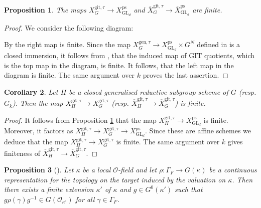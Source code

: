 \documentclass{amsart}
\newtheorem{prop}{Proposition}[section]
\newtheorem{cor}[prop]{Corollary}
\theoremstyle{definition}
\theoremstyle{remark}
\DeclareMathOperator{\GL}{GL}
\newcommand{\OO}{\mathcal O}
\newcommand{\ps}{\mathrm{ps}}
\newcommand{\gen}{\mathrm{gen}}
\newcommand{\gps}{\mathrm{git}}
\newcommand{\XpsGLd}{X^{\ps}_{\GL_d}}
\newcommand{\XbarpsGLd}{\overline{X}^{\ps}_{\GL_d}}
\newcommand{\XgenGtau}{X^{\gen, \tau}_G}
\newcommand{\XbargpsHtau}{\overline{X}^{\gps,\tau}_H}
\newcommand{\XgpsGtau}{X^{\gps, \tau}_{G}}
\newcommand{\XgpsHtau}{X^{\gps, \tau}_{H}}
\newcommand{\XbargpsGtau}{\overline{X}^{\gps,\tau}_G}
\begin{document}
\begin{prop}\label{GGLd_finite} The maps $\XgpsGtau \to \XpsGLd$ and $\XbargpsGtau\rightarrow \XbarpsGLd$ are finite.
\end{prop}

\begin{proof}
    We consider the following diagram:
    \begin{center}
    \end{center}
    By  the right map is finite.
    Since the map $\XgenGtau \to \XpsGLd \times G^N$ defined in  is a closed immersion, it follows from \cite[Theorem 2 (ii)]{seshadri}, that the induced map of GIT quotients, which is the top map in the diagram, is finite. It follows, that the left map in the diagram is finite. The same argument over $k$ proves the last assertion. 
\end{proof}



 \begin{cor}\label{finite_HG} Let $H$ be a closed generalised reductive subgroup scheme of $G$ (resp. $G_k$). Then the 
 map $\XgpsHtau \rightarrow \XgpsGtau$ (resp. $\XbargpsHtau \rightarrow \XbargpsGtau$) is finite. 
\end{cor}
\begin{proof} It follows from Proposition \ref{GGLd_finite} that the map
$\XgpsHtau \rightarrow \XpsGLd$ is finite. Moreover, it factors as 
$\XgpsHtau \rightarrow\XgpsGtau \rightarrow \XpsGLd$.
Since these are affine schemes we deduce that the map $\XgpsHtau \rightarrow \XgpsGtau$ 
is finite. The same argument over $k$ gives finiteness of $\XbargpsHtau \rightarrow \XbargpsGtau$.
\end{proof}

\begin{prop}[{\cite[Lemma 4.3]{cotner}}]\label{building} Let $\kappa$ be a local $\OO$-field and let $\rho: \Gamma_F \rightarrow 
G(\kappa)$ be a continuous representation for the topology on the target induced
by the valuation on $\kappa$. Then there exists a finite extension $\kappa'$ of 
$\kappa$ and $g\in G^0(\kappa')$ such that $g \rho(\gamma) g^{-1} \in G(\OO_{\kappa'})$ for all $\gamma\in \Gamma_F$.
\end{prop} 
\end{document}
